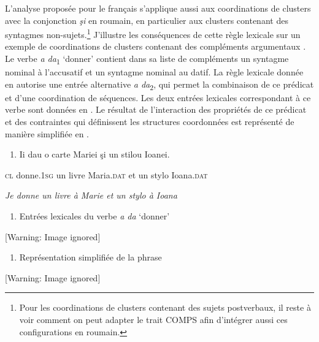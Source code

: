 L'analyse proposée pour le français s'applique aussi aux coordinations de clusters avec la conjonction \textit{şi} en roumain, en particulier aux clusters contenant des syntagmes non-sujets.\footnote{Pour les coordinations de clusters contenant des sujets postverbaux, il reste à voir comment on peut adapter le trait COMPS afin d'intégrer aussi ces configurations en roumain.} J'illustre les conséquences de cette règle lexicale sur un exemple de coordinations de clusters contenant des compléments argumentaux . Le verbe \textit{a da}\textsubscript{1} `donner' contient dans sa liste de compléments un syntagme nominal à l'accusatif et un syntagme nominal au datif. La règle lexicale donnée en  autorise une entrée alternative \textit{a da}\textsubscript{2}, qui permet la combinaison de ce prédicat et d'une coordination de séquences. Les deux entrées lexicales correspondant à ce verbe sont données en . Le résultat de l'interaction des propriétés de ce prédicat et des contraintes qui définissent les structures coordonnées est représenté de manière simplifiée en .  


\begin{enumerate}
\item   \label{bkm:Ref300066622}Ii  dau  o  carte  Mariei  şi  un  stilou  Ioanei.


\end{enumerate}
\textsc{cl } donne.\textsc{1sg}  un  livre  Maria.\textsc{dat}  et  un  stylo  Ioana.\textsc{dat}

{\itshape
Je donne un livre à Marie et un stylo à Ioana}


\begin{enumerate}
\item \label{bkm:Ref300067000}Entrées lexicales du verbe \textit{a da} `donner'


\end{enumerate}
  [Warning: Image ignored] %
 


\begin{enumerate}
\item \label{bkm:Ref302431922}Représentation simplifiée de la phrase 


\end{enumerate}
  [Warning: Image ignored] %
 

